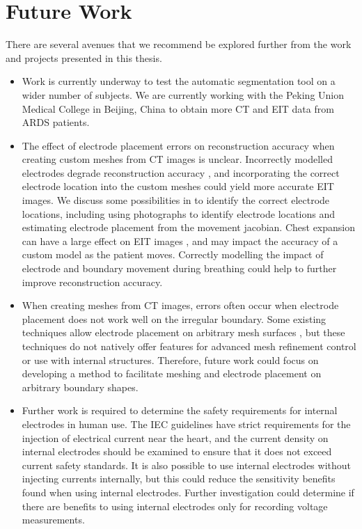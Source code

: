 \section{Future Work}

There are several avenues that we recommend be explored further from the work and projects
presented in this thesis. 

\begin{itemize}
	\item Work is currently underway to test the automatic segmentation tool on a wider
	number of subjects. We are currently working with the Peking Union Medical College in 
	Beijing, China to obtain more CT and EIT data from ARDS patients.

	\item The effect of electrode placement errors on reconstruction accuracy
	when creating custom meshes from CT images is unclear. 
	Incorrectly modelled electrodes degrade reconstruction accuracy \parencite{boyle_impact_2011},
	and incorporating the correct electrode location into the custom meshes could yield 
	more accurate EIT images. We discuss some possibilities in  to identify 
	the correct electrode locations, including using photographs to identify electrode locations
	and estimating electrode placement from the movement 
	jacobian. Chest expansion can have a large effect on EIT images 
	\parencite{adler_impedance_1994}, and may impact the 
	accuracy of a custom model as the patient moves. 
	Correctly modelling the impact of electrode and boundary movement 
	during breathing could help to further improve reconstruction accuracy.

	\item When creating meshes from CT images, errors often occur when electrode placement does not 
	work well on the irregular boundary. 
	Some existing techniques allow electrode 
	placement on arbitrary mesh surfaces \parencite{grychtol_fem_2013}, 
	but these techniques do not 
	natively offer features for advanced mesh refinement control 
	or use with internal structures. Therefore,  
	future work could focus on developing a method to facilitate meshing and electrode
	placement on arbitrary boundary shapes.

	\item Further work is required to determine the safety requirements for internal electrodes in human use.
	The IEC guidelines \parencite{international_electrotechnical_commission_iec_2021} have strict
	requirements for the injection of electrical current near the heart, and the current density on 
	internal electrodes should be examined to ensure that it does not exceed current safety standards. 
	It is also possible to use internal electrodes without injecting currents internally, 
	but this could reduce the sensitivity benefits found when using internal electrodes.
	Further investigation could determine if there are benefits 
	to using internal electrodes only for recording voltage measurements. 


\end{itemize}
